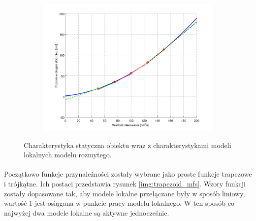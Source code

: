\documentclass[a4paper,12pt]{article}
\begin{document}
\begin{figure}[h]
   \centering
   \begin{subfigure}[h]{0.45\textwidth}
      \includegraphics[width=\textwidth]{img/lokalne_modele_liniowe.png}
   \end{subfigure}
   \caption{Charakterystyka statyczna obiektu wraz z charakterystykami modeli lokalnych modelu rozmytego.}
   \label{img:lokalne_modele_liniowe}
\end{figure}

\paragraph{}
Początkowo funkcje przynależności zostały wybrane jako proste funkcje trapezowe i trójkątne.
Ich postaci przedstawia rysunek \ref{img:trapezoid_mfs}.
Wzory funkcji zostały dopasowane tak, aby modele lokalne przełączane były w sposób liniowy, wartość 1 jest osiągana w punkcie pracy modelu lokalnego.
W ten sposób co najwyżej dwa modele lokalne są aktywne jednocześnie.

\newpage
\end{document}

